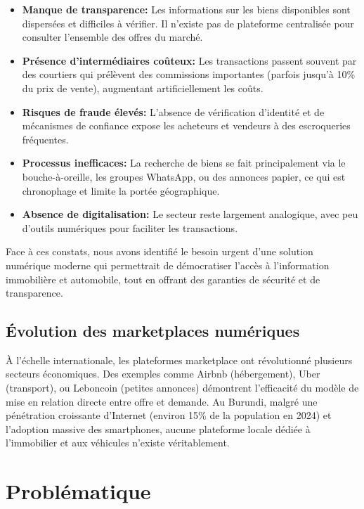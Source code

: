 \documentclass[12pt,a4paper]{report}
\begin{document}
\begin{itemize}
    \item \textbf{Manque de transparence:} Les informations sur les biens disponibles sont dispersées et difficiles à vérifier. Il n'existe pas de plateforme centralisée pour consulter l'ensemble des offres du marché.

    \item \textbf{Présence d'intermédiaires coûteux:} Les transactions passent souvent par des courtiers qui prélèvent des commissions importantes (parfois jusqu'à 10\% du prix de vente), augmentant artificiellement les coûts.

    \item \textbf{Risques de fraude élevés:} L'absence de vérification d'identité et de mécanismes de confiance expose les acheteurs et vendeurs à des escroqueries fréquentes.

    \item \textbf{Processus inefficaces:} La recherche de biens se fait principalement via le bouche-à-oreille, les groupes WhatsApp, ou des annonces papier, ce qui est chronophage et limite la portée géographique.

    \item \textbf{Absence de digitalisation:} Le secteur reste largement analogique, avec peu d'outils numériques pour faciliter les transactions.
\end{itemize}

Face à ces constats, nous avons identifié le besoin urgent d'une solution numérique moderne qui permettrait de démocratiser l'accès à l'information immobilière et automobile, tout en offrant des garanties de sécurité et de transparence.

\subsection{Évolution des marketplaces numériques}

À l'échelle internationale, les plateformes marketplace ont révolutionné plusieurs secteurs économiques. Des exemples comme Airbnb (hébergement), Uber (transport), ou Leboncoin (petites annonces) démontrent l'efficacité du modèle de mise en relation directe entre offre et demande. Au Burundi, malgré une pénétration croissante d'Internet (environ 15\% de la population en 2024) et l'adoption massive des smartphones, aucune plateforme locale dédiée à l'immobilier et aux véhicules n'existe véritablement.

\section{Problématique}
\end{document}
